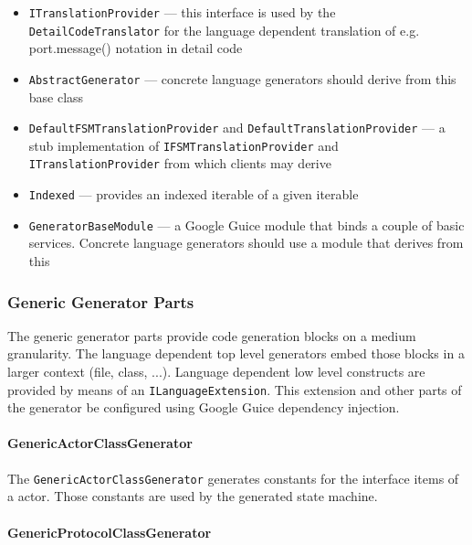 \begin{itemize}
\item \begin{flushleft}\texttt{ITranslationProvider} --- this interface is used by the 
\texttt{DetailCodeTranslator} for the language dependent translation of e.g. port.message() notation in 
detail code\end{flushleft}
\item \texttt{AbstractGenerator} --- concrete language generators should derive from this base class
\item \begin{flushleft}\texttt{DefaultFSMTranslationProvider} and \texttt{DefaultTranslationProvider} --- a stub implementation of 
\texttt{IFSMTranslationProvider} and \texttt{ITranslationProvider} from which clients may derive\end{flushleft}
\item \texttt{Indexed} --- provides an indexed iterable of a given iterable
\item \texttt{GeneratorBaseModule} --- a Google Guice module that binds a couple of basic services. 
Concrete language generators should use a module that derives from this
\end{itemize}

\subsubsection*{Generic Generator Parts}

The generic generator parts provide code generation blocks on a medium granularity. The language dependent 
top level generators embed those blocks in a larger context (file, class, ...). Language dependent low 
level constructs are provided by means of an \texttt{ILanguageExtension}. This extension and other parts 
of the generator be configured using Google Guice dependency injection.

\paragraph*{GenericActorClassGenerator}

The \texttt{GenericActorClassGenerator} generates constants for the interface items of a actor. Those 
constants are used by the generated state machine.

\paragraph*{GenericProtocolClassGenerator}

